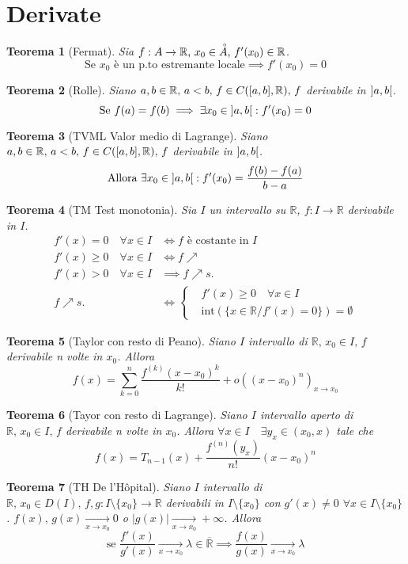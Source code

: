 \documentclass[10pt,a4paper]{article}
\newtheorem{teorema}{Teorema}[section]
\newcommand{\teor}[2][]{\begin{teorema}[#1]#2\end{teorema}}
\newcommand{\R}{\mathbb{R}}
\newcommand{\Rbar}{\overline{\mathbb{R}}}
\newcommand{\Lim}[1][]{\xrightarrow[#1]{}}
\renewcommand{\,}{\text{, }}
\begin{document}
\section{Derivate}
\teor[Fermat]{
    Sia $f:A \to \R \, x_0 \in \accentset{\circ}{A}\, f'(x_0) \in \R$.
    \[
        \text{Se } x_0 \text{ è un p.to estremante locale} \implies f'(x_0) = 0
    \]
}
\teor[Rolle]{
    Siano $a,b \in \R \, a < b \, f \in C(\interval{a}{b}, \R) \, f$ derivabile in $\interval[open]{a}{b}$.
    \[
        \text{Se } f(a) = f(b) \implies \exists x_0 \in \interval[open]{a}{b}: f'(x_0) = 0
    \]
}
\teor[TVML Valor medio di Lagrange]{
    Siano $a,b \in \R \, a < b \, f \in C(\interval{a}{b}, \R) \, f$ derivabile in $\interval[open]{a}{b}$.
    \[
        \text{Allora } \exists x_0 \in \interval[open]{a}{b} : f'(x_0) = \frac{f(b) - f(a)}{b-a}
    \]
}
\teor[TM Test monotonia]{
    Sia $I$ un intervallo su $\R$, $f:I \to \R$ derivabile in $I$.
    \begin{align}
        f'(x) = 0 \quad \forall x \in I             & \iff f \text{ è costante in } I \\
        f'(x) \ge 0 \quad           \forall x \in I & \iff f \nearrow                 \\
        f'(x) > 0 \quad           \forall x \in I   & \implies f \nearrow s.          \\
        f \nearrow s.                               & \iff
        \begin{cases}
             & f'(x) \ge 0 \quad \forall x \in I \\  &\text{int}(\{x \in \R / f'(x) = 0\}) = \emptyset
        \end{cases}
    \end{align}
}
\teor[Taylor con resto di Peano]{
    Siano $I$ intervallo di $\R \, x_0 \in I \, f$ derivabile n volte in $x_0$. Allora
    \[
        f(x) = \sum_{k = 0}^{n} \frac{f^{(k)} (x-x_0)^k}{k!} + o((x-x_0)^n)_{x \to x_0}
    \]
}
\teor[Tayor con resto di Lagrange]{
    Siano $I$ intervallo aperto di $\R \, x_0 \in I \, f$ derivabile n volte in $x_0$. Allora $\forall x \in I \quad \exists y_x \in (x_0,x)$ tale che
    \[
        f(x) = T_{n-1}(x) + \frac{f^{(n)}(y_x)}{n!}(x-x_0)^{n}
    \]
}
\teor[TH De l'Hôpital]{
    Siano $I$ intervallo di $\R \, x_0 \in D(I) \, f,g: I \setminus \{x_0\} \to \R $ derivabili in $I \setminus \{ x_0 \}$ con $g'(x) \neq 0$ $ \forall x \in I \setminus \{x_0\}$. $f(x) \, g(x) \Lim[x \to x_0] 0$ o $|g(x)| \Lim[x \to x_0] +\infty$. Allora
    \[
        \text{se } \frac{f'(x)}{g'(x)} \Lim[x \to x_0] \lambda \in \Rbar \implies \frac{f(x)}{g(x)} \Lim[x \to x_0] \lambda
    \]

}
\end{document}
